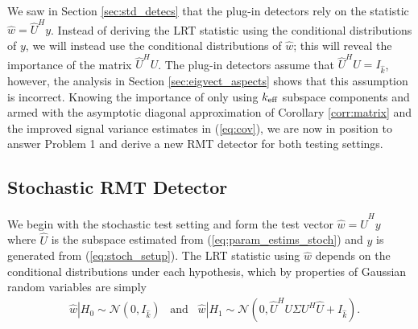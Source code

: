 We saw in Section \ref{sec:std_detecs} that the plug-in detectors rely on the statistic $\widehat{w}=\widehat{U}^Hy$. Instead of deriving the LRT statistic using the conditional distributions of $y$, we will instead use the conditional distributions of $\widehat{w}$; this will reveal the importance of the matrix $\widehat{U}^HU$. The plug-in detectors assume that $\widehat{U}^HU=I_{\widehat{k}}$, however, the analysis in Section \ref{sec:eigvect_aspects} shows that this assumption is incorrect. Knowing the importance of only using $k_\text{eff}$ subspace components and armed with the asymptotic diagonal approximation of Corollary \ref{corr:matrix} and the improved signal variance estimates in (\ref{eq:cov}), we are now in position to answer Problem 1 and derive a new RMT detector for both testing settings.

\subsection{Stochastic RMT Detector}\label{sec:rmt_stoch}

We begin with the stochastic test setting and form the test vector $\widehat{w}=\widehat{U}^Hy$ where $\widehat{U}$ is the subspace estimated from (\ref{eq:param_estims_stoch}) and $y$ is generated from (\ref{eq:stoch_setup}). The LRT statistic using $\widehat{w}$ depends on the conditional distributions under each hypothesis, which by properties of Gaussian random variables are simply
\begin{equation}\label{eq:stoch_distr}
\begin{aligned}
&\widehat{w}|H_0\sim\mathcal{N}\left(0,I_{\widehat{k}}\right)\,\,\,\text{ and }\,\,\,\widehat{w}|H_1\sim\mathcal{N}\left(0, \widehat{U}^HU\Sigma U^H\widehat{U} +I_{\widehat{k}}\right).\\
\end{aligned}
\end{equation}

